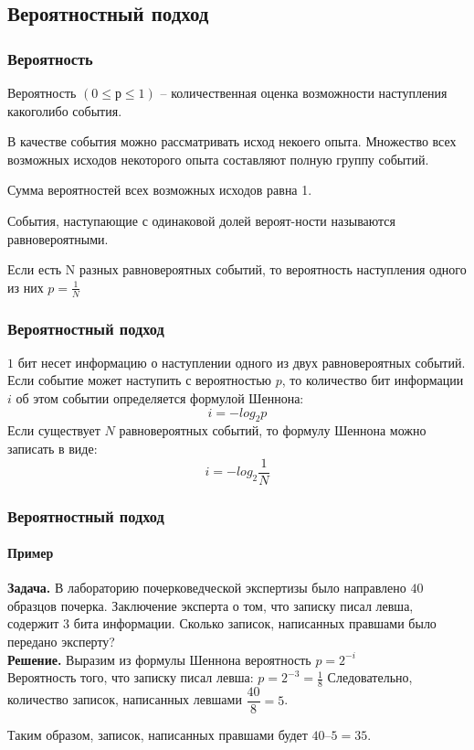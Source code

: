  \subsection{Вероятностный подход}

 \begin{frame}
\frametitle{Вероятность}

Вероятность $(0 \leq р \leq 1)$ – количественная оценка возможности наступления какоголибо события.

В качестве события можно рассматривать исход некоего опыта. 
Множество всех возможных исходов некоторого опыта составляют полную группу событий. 

Сумма вероятностей всех возможных исходов равна 1. 

События, наступающие с одинаковой долей вероят-ности называются равновероятными.

Если есть N разных равновероятных событий, то вероятность наступления одного из них $p = \frac{1}{N}$

\end{frame}

\begin{frame}
\frametitle{Вероятностный подход}

$1$ бит несет информацию о наступлении одного из двух равновероятных событий.
Если событие может наступить с вероятностью $p$, то количество бит информации $i$ об этом событии определяется формулой Шеннона:
$$i=-log_2p $$ 
Если существует $N$ равновероятных событий, то формулу Шеннона можно записать в виде:
$$i=-log_2\frac{1}{N} $$ 


\end{frame}

\begin{frame}
\frametitle{Вероятностный подход}
\framesubtitle{Пример}

\textbf{Задача.} В лабораторию почерковедческой экспертизы было направлено $40$ образцов почерка. Заключение эксперта о том, что записку писал левша, содержит $3$ бита информации. Сколько записок, написанных правшами было передано эксперту? \\ \pause
\textbf{Решение.} Выразим из формулы Шеннона вероятность $p=2^{-i}$\\  \pause
Вероятность того, что записку писал левша: $p=2^{-3}=\frac{1}{8}$
Следовательно, количество записок, написанных левшами $\dfrac{40}{8} = 5$. 

Таким образом, записок, написанных правшами будет  $40 – 5 = 35$.




\end{frame}

